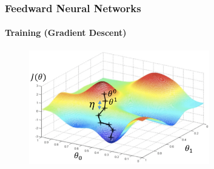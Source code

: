 \documentclass[german,aspectratio=169]{beamer}
\begin{document}

\begin{frame}
	\frametitle{Feedward Neural Networks}
	\framesubtitle{Training (Gradient Descent)}
	\begin{figure}
	\includegraphics[width=0.7\textwidth]{gd_example.png}
\end{figure}
\end{frame}
\end{document}
